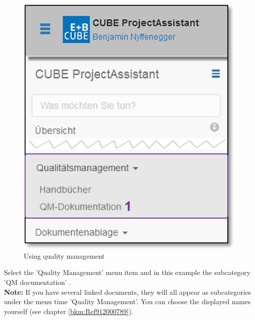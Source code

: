 \begin{figure}   %
  \vspace{-35pt}      %
  \begin{center}
    \includegraphics[width=1\linewidth]{../chapters/09_Qualitaetsmanagement/pictures/9-1_Menu_Qualitaetsmanagement.jpg}
  \end{center}
  \vspace{-20pt}
  \caption{Using quality management}
  \vspace{-10pt}
\end{figure}

Select the 'Quality Management' menu item and in this example the subcategory 'QM documentation' . \\
 
\textbf{Note:} If you have several linked documents, they will all appear as subcategories under the menu time 'Quality Management'. You can choose the displayed names yourself (see chapter \ref{bkm:Ref912000789}). \\

